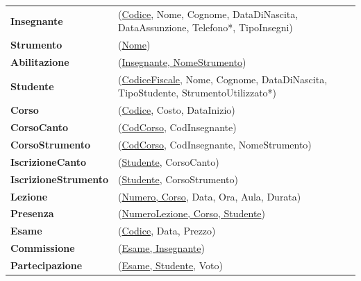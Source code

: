 \documentclass{article}
\begin{document}
\begin{tabular}{ll}
	\textbf{Insegnante} & (\underline{Codice}, Nome, Cognome, DataDiNascita, DataAssunzione, Telefono*, TipoInsegni) \\
	
	\textbf{Strumento} & (\underline{Nome}) \\
	
	\textbf{Abilitazione} & (\underline{Insegnante, NomeStrumento}) \\
	
	\textbf{Studente} & (\underline{CodiceFiscale}, Nome, Cognome, DataDiNascita, TipoStudente, StrumentoUtilizzato*) \\
	
	\textbf{Corso} & (\underline{Codice}, Costo, DataInizio) \\
	
	\textbf{CorsoCanto} & (\underline{CodCorso}, CodInsegnante) \\
	
	\textbf{CorsoStrumento} & (\underline{CodCorso}, CodInsegnante, NomeStrumento) \\
	
	\textbf{IscrizioneCanto} & (\underline{Studente}, CorsoCanto) \\
	
	\textbf{IscrizioneStrumento} & (\underline{Studente}, CorsoStrumento) \\
	
	\textbf{Lezione} & (\underline{Numero, Corso}, Data, Ora, Aula, Durata) \\
	
	\textbf{Presenza} & (\underline{NumeroLezione, Corso, Studente}) \\
	
	\textbf{Esame} & (\underline{Codice}, Data, Prezzo) \\
	
	\textbf{Commissione} & (\underline{Esame, Insegnante}) \\
	
	\textbf{Partecipazione} & (\underline{Esame, Studente}, Voto) \\
\end{tabular}
\end{document}
